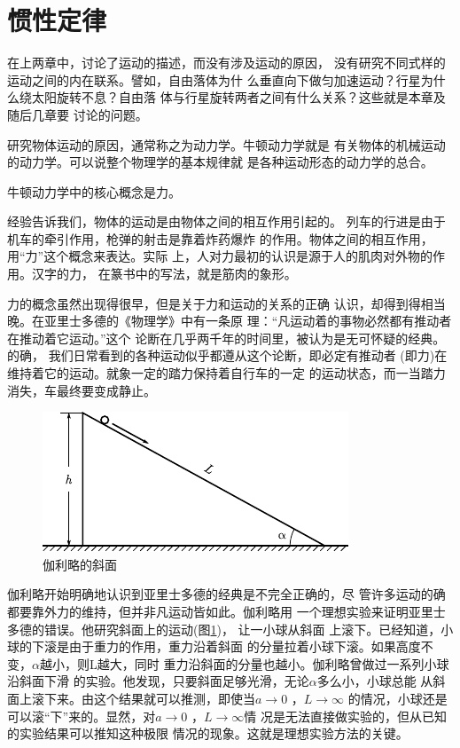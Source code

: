 \section{惯性定律}\label{sec:03.01}
\vspace{-0.5em}
在上两章中，讨论了运动的描述，而没有涉及运动的原因，
没有研究不同式样的运动之间的内在联系。譬如，自由落体为什
么垂直向下做匀加速运动？行星为什么绕太阳旋转不息？自由落
体与行星旋转两者之间有什么关系？这些就是本章及随后几章要
讨论的问题。

研究物体运动的原因，通常称之为动力学。牛顿动力学就是
有关物体的机械运动的动力学。可以说整个物理学的基本规律就
是各种运动形态的动力学的总合。

牛顿动力学中的核心概念是力。

经验告诉我们，物体的运动是由物体之间的相互作用引起的。
列车的行进是由于机车的牵引作用，枪弹的射击是靠着炸药爆炸
的作用。物体之间的相互作用，用“力”这个概念来表达。实际
上，人对力最初的认识是源于人的肌肉对外物的作用。汉字的力，
在篆书中的写法，就是筋肉的象形。

力的概念虽然出现得很早，但是关于力和运动的关系的正确
认识，却得到得相当晚。在亚里士多德的《物理学》中有一条原
理：“凡运动着的事物必然都有推动者在推动着它运动。”这个
论断在几乎两千年的时间里，被认为是无可怀疑的经典。的确，
我们日常看到的各种运动似乎都遵从这个论断，即必定有推动者
(即力)在维持着它的运动。就象一定的踏力保持着自行车的一定
的运动状态，而一当踏力消失，车最终要变成静止。

\begin{figure}
    \includegraphics{figure/fig03.01}
    \caption{伽利略的斜面}
    \label{fig:03.01}
\end{figure}
伽利略开始明确地认识到亚里士多德的经典是不完全正确的，尽
管许多运动的确都要靠外力的维持，但并非凡运动皆如此。伽利略用
一个理想实验来证明亚里士多德的错误。他研究斜面上的运动(图\ref{fig:03.01})，
让一小球从斜面
上滚下。已经知道，小球的下滚是由于重力的作用，重力沿着斜面
的分量拉着小球下滚。如果高度不变，$\alpha$越小，则L越大，同时
重力沿斜面的分量也越小。伽利略曾做过一系列小球沿斜面下滑
的实验。他发现，只要斜面足够光滑，无论$\alpha$多么小，小球总能
从斜面上滚下来。由这个结果就可以推测，即使当$ a \rightarrow 0$  ，$L \rightarrow \infty$
的情况，小球还是可以滚“下”来的。显然，对$ a \rightarrow 0$  ，$L \rightarrow \infty$情
况是无法直接做实验的，但从已知的实验结果可以推知这种极限
情况的现象。这就是理想实验方法的关键。

